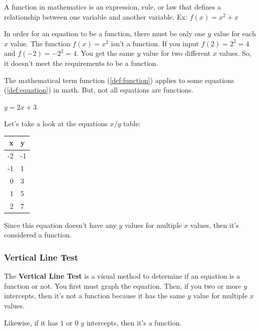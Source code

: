 \begin{definition}[Function]
  \label{def:function}

  A function in mathematics is an expression, rule, or law that defines a
  relationship between one variable and another variable. Ex: $f(x) = x^{2} + x$

  In order for an equation to be a function, there must be only one $y$ value
  for each $x$ value. The function $f(x) = x^{2}$ isn't a function. If you input
  $f(2) = 2^{2} = 4$ and $f(-2) = -2^{2} = 4$. You get the same $y$ value for
  two different $x$ values. So, it doesn't meet the requirements to be a
  function.
\end{definition}

The mathematical term function (\ref{def:function}) applies to some equations
(\ref{def:equation}) in math.
But, not all equations are functions.

\begin{example}
  \label{exm:equations_vs_functions_1}

  $y = 2x + 3$ 

  Let's take a look at the equations $x/y$ table:

  \begin{center}
    \begin{tabular}{|r|l|}
      \hline
      x & y \\ \hline
      -2 & -1 \\ \hline
      -1 & 1 \\ \hline
      0 & 3 \\ \hline
      1 & 5 \\ \hline
      2 & 7 \\ \hline
    \end{tabular}
  \end{center}

  Since this equation doesn't have any $y$ values for multiple $x$ values, then
  it's considered a function.
\end{example}


\subsubsection{Vertical Line Test}
\label{sub_sub_sec:vertical_line_test}

\begin{definition}
  \label{def:vertical_line_test}

  The \textbf{Vertical Line Test} is a visual method to determine if an equation
  is a function or not. You first must graph the equation. Then, if you two or
  more $y$ intercepts, then it's not a function because it has the same $y$ 
  value for multiple $x$ values.

  Likewise, if it has $1$ or $0$ $y$ intercepts, then it's a function.
\end{definition}

